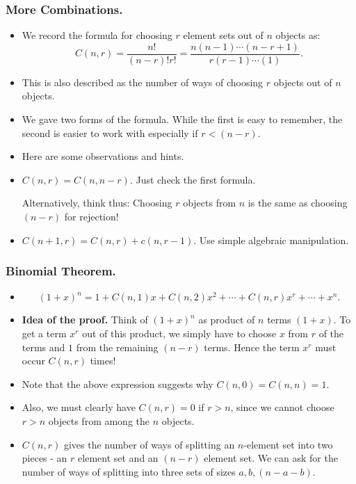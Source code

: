 

\begin{frame}%
  \frametitle{More Combinations.}
  \begin{itemize}%
\item We record the formula for choosing $r$ element sets out of $n$
objects as:
$$C(n,r) = \frac{n!}{(n-r)!r!} =
\frac{n(n-1)\cdots (n-r+1)}{r(r-1)\cdots (1)}.$$

\item This is also described as the number of ways of choosing $r$
objects out of $n$ objects.

\item We gave two forms of the formula. While the first is easy to
remember, the second is easier to work with especially if $r<(n-r)$.

\item Here are some observations and hints.

\item $C(n,r)=C(n,n-r)$. Just check the first formula.

Alternatively, think thus: Choosing $r$ objects from $n$ is the same as
choosing $(n-r)$ for rejection!

\item $C(n+1,r) = C(n,r)+c(n,r-1)$. Use simple algebraic manipulation.


\end{itemize}
\end{frame}
%

\begin{frame}%
  \frametitle{Binomial Theorem.}
  \begin{itemize}%
\item {}
$$(1+x)^n = 1 + C(n,1)x+C(n,2)x^2+\cdots +C(n,r)x^r+\cdots +x^n.$$
\item {\bf Idea of the proof.} Think of $(1+x)^n$ as product of $n$
terms $(1+x)$. To get a term $x^r$ out of this product, we simply have
to choose $x$ from $r$ of the terms and $1$ from the remaining $(n-r)$
terms. Hence the term $x^r$ must occur $C(n,r)$ times!

\item Note that the above expression suggests why $C(n,0)=C(n,n)=1$.

\item Also, we must clearly have $C(n,r)=0$ if $r>n$, since we cannot
choose $r>n$ objects from among the $n$ objects.

\item $C(n,r)$ gives the number of ways of splitting an $n$-element set
into two pieces - an $r$ element set and an $(n-r)$ element set. We can
ask for the number of ways of splitting into three sets of sizes
$a,b,(n-a-b)$. 


\end{itemize}
\end{frame}
%


